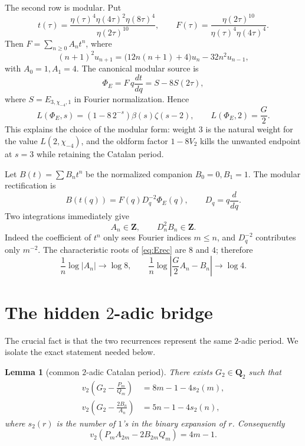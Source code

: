 \documentclass[11pt]{article}
\newtheorem{lemma}[theorem]{Lemma}
\newcommand{\Z}{\mathbf Z}
\newcommand{\Qtwo}{\mathbf Q_2}
\newcommand{\vTwo}{v_2}
\begin{document}
The second row is modular.  Put
\[
 t(\tau)=
 \frac{\eta(\tau)^4\eta(4\tau)^2\eta(8\tau)^4}{\eta(2\tau)^{10}},
 \qquad
 F(\tau)=
 \frac{\eta(2\tau)^{10}}{\eta(\tau)^4\eta(4\tau)^4}.
\]
Then $F=\sum_{n\ge0}A_nt^n$, where
\begin{equation}\label{eq:Erec}
 (n+1)^2u_{n+1}
 =\bigl(12n(n+1)+4\bigr)u_n-32n^2u_{n-1},
\end{equation}
with $A_0=1,A_1=4$.  The canonical modular source is
\[
 \Phi_E=F\,q\frac{dt}{dq}=S-8S(2\tau),
\]
where $S=E_{3,\chi_{-4},1}$ in Fourier normalization.  Hence
\[
 L(\Phi_E,s)=(1-8\,2^{-s})\beta(s)\zeta(s-2),
 \qquad
 L(\Phi_E,2)=\frac{G}{2}.
\]
This explains the choice of the modular form: weight $3$ is the natural
weight for the value $L(2,\chi_{-4})$, and the oldform factor $1-8V_2$
kills the unwanted endpoint at $s=3$ while retaining the Catalan period.

Let $B(t)=\sum B_nt^n$ be the normalized companion $B_0=0,B_1=1$.  The
modular rectification is
\begin{equation}\label{eq:companion}
 B(t(q))=F(q)D_q^{-2}\Phi_E(q),
 \qquad D_q=q\frac d{dq}.
\end{equation}
Two integrations immediately give
\begin{equation}\label{eq:Eden}
 A_n\in\Z,
 \qquad D_n^2B_n\in\Z.
\end{equation}
Indeed the coefficient of $t^n$ only sees Fourier indices $m\le n$, and
$D_q^{-2}$ contributes only $m^{-2}$.  The characteristic roots of
\eqref{eq:Erec} are $8$ and $4$; therefore
\begin{equation}\label{eq:Earch}
 \frac1n\log|A_n|\to\log8,
 \qquad
 \frac1n\log\left|\frac G2A_n-B_n\right|\to\log4.
\end{equation}

\section{The hidden $2$-adic bridge}

The crucial fact is that the two recurrences represent the same $2$-adic
period.  We isolate the exact statement needed below.

\begin{lemma}[common $2$-adic Catalan period]\label{lem:p2}
There exists $G_2\in\Qtwo$ such that
\begin{align}
 \vTwo\!\left(G_2-\frac{P_m}{Q_m}\right)
 &=8m-1-4s_2(m),\label{eq:Ztail}\\
 \vTwo\!\left(G_2-\frac{2B_n}{A_n}\right)
 &=5n-1-4s_2(n),\label{eq:Etail}
\end{align}
where $s_2(r)$ is the number of $1$'s in the binary expansion of $r$.
Consequently
\begin{equation}\label{eq:diag}
 \vTwo(P_mA_{2m}-2B_{2m}Q_m)=4m-1.
\end{equation}
\end{lemma}
\end{document}
